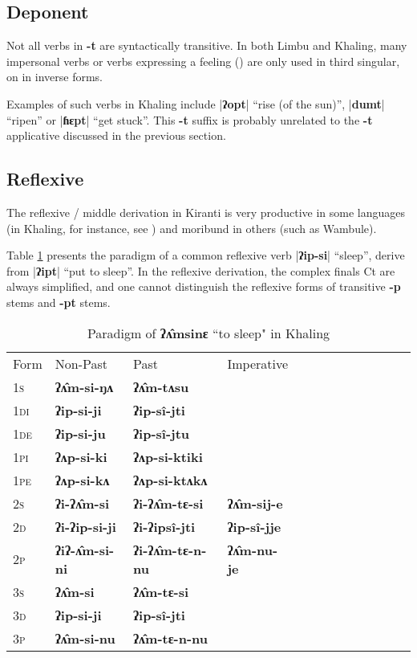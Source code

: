 \documentclass[oldfontcommands,oneside,a4paper,11pt]{article}
\newcommand{\ipa}[1]{\textbf{{\phon\mbox{#1}}}} %
\newcommand{\grise}[1]{\cellcolor{lightgray}\textbf{#1}}
\newcommand{\dhatu}[2]{|\ipa{#1}| ``#2''}
\begin{document}
\subsection{Deponent} \label{sec:deponent}
Not all verbs in \ipa{-t} are syntactically transitive. In both Limbu and Khaling, many impersonal verbs or verbs expressing a feeling (\citealt{michailovsky97deponent}) are only used in third singular, on in inverse forms.  

Examples of such verbs in Khaling include \dhatu{ʔopt}{rise (of the sun)},  \dhatu{dumt}{ripen} or \dhatu{ɦɛpt}{get stuck}. This \ipa{-t} suffix is probably unrelated to the \ipa{-t} applicative discussed in the previous section. 

\subsection{Reflexive} \label{sec:refl}
The reflexive / middle derivation in Kiranti is very productive in some languages (in Khaling, for instance, see \citealt{jacques16si}) and moribund in others (such as Wambule). 


Table \ref{tab:ip.vr} presents the paradigm of a common reflexive verb \dhatu{ʔip-si}{sleep}, derive from \dhatu{ʔipt}{put to sleep}. In the reflexive derivation, the complex finals Ct are always simplified, and one cannot distinguish the reflexive forms of transitive \ipa{-p} stems and \ipa{-pt} stems.

\begin{table}[h]
\label{tab:ip.vr} \centering 
\caption{Paradigm of \ipa{ʔʌ̂msinɛ}  ``to sleep" in Khaling }
\begin{tabular}{l|l|l|l|l|l|l|l|l|l|l|l|l} 
\toprule
Form& Non-Past & Past & Imperative \\
\textsc{1s} & \ipa{ʔʌ̂m-si-ŋʌ}  \grise{}& \ipa{ʔʌ̂m-tʌsu} \grise{}&\\ 
\textsc{1di} &\ipa{ʔip-si-ji}  & \ipa{ʔip-sî-jti}  & \\
\textsc{1de} &\ipa{ʔip-si-ju}  & \ipa{ʔip-sî-jtu}  & \\ 
\textsc{1pi} &\ipa{ʔʌp-si-ki}  & \ipa{ʔʌp-si-ktiki} & \\ 
\textsc{1pe} &\ipa{ʔʌp-si-kʌ}  & \ipa{ʔʌp-si-ktʌkʌ} &  \\ 
\textsc{2s} & \ipa{ʔi-ʔʌ̂m-si}  \grise{}& \ipa{ʔi-ʔʌ̂m-tɛ-si} \grise{} & \ipa{ʔʌ̂m-sij-e}  \grise{}\\ 
\textsc{2d} & \ipa{ʔi-ʔip-si-ji}  & \ipa{ʔi-ʔipsî-jti}  & \ipa{ʔip-sî-jje}    \\
\textsc{2p} & \ipa{ʔiʔ-ʌ̂m-si-ni} \grise{} & \ipa{ʔi-ʔʌ̂m-tɛ-n-nu} \grise{} & \ipa{ʔʌ̂m-nu-je}  \grise{}\\ 
\textsc{3s} & \ipa{ʔʌ̂m-si}  \grise{}& \ipa{ʔʌ̂m-tɛ-si}  \grise{} &\\ 
\textsc{3d} & \ipa{ʔip-si-ji}  & \ipa{ʔip-sî-jti} &  \\ 
\textsc{3p} & \ipa{ʔʌ̂m-si-nu}\grise{}  & \ipa{ʔʌ̂m-tɛ-n-nu} \grise{}&\\ 
\bottomrule
\end{tabular}
\end{table}
\end{document}
